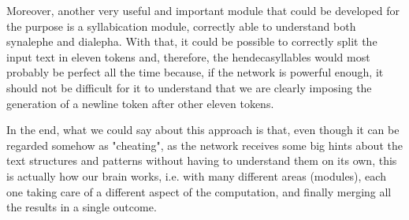 Moreover, another very useful and important module that could be developed for the purpose is a syllabication module, correctly able to understand both synalephe and dialepha.
With that, it could be possible to correctly split the input text in eleven tokens and, therefore, the hendecasyllables would most probably be perfect all the time because, if the network is powerful enough, it should not be difficult for it to understand that we are clearly imposing the generation of a newline token after other eleven tokens.

In the end, what we could say about this approach is that, even though it can be regarded somehow as "cheating", as the network receives some big hints about the text structures and patterns without having to understand them on its own, this is actually how our brain works, i.e. with many different areas (modules), each one taking care of a different aspect of the computation, and finally merging all the results in a single outcome.
